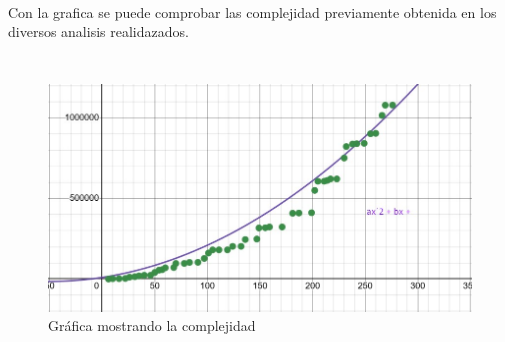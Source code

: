 \documentclass[12pt,twoside]{article}
\begin{document}
\\
Con la grafica se puede comprobar las complejidad previamente obtenida en los diversos analisis realidazados.
\\
\\
\subsubsection{}
\begin{figure}[h!]
\centering
\includegraphics[scale=0.8]{grafica.jpg}
\caption{Gráfica mostrando la complejidad}
\label{fig:universe}
\end{figure}

\clearpage
\end{document}
